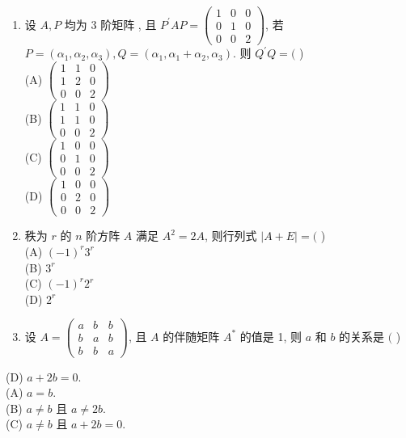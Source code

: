 \documentclass[10pt]{article}
\begin{document}
{\begin{enumerate}
  \item  设  $A, P$  均为  3  阶矩阵 ,  且  $P^{\prime} A P=\left(\begin{array}{lll}1 & 0 & 0 \\ 0 & 1 & 0 \\ 0 & 0 & 2\end{array}\right)$,  若  $P=\left(\alpha_{1}, \alpha_{2}, \alpha_{3}\right), Q=\left(\alpha_{1}, \alpha_{1}+\alpha_{2}, \alpha_{3}\right)$.  则  $Q^{\prime} Q=($ )\\
(A) $\left(\begin{array}{lll}1 & 1 & 0 \\ 1 & 2 & 0 \\ 0 & 0 & 2\end{array}\right)$\\
(B) $\left(\begin{array}{lll}1 & 1 & 0 \\ 1 & 1 & 0 \\ 0 & 0 & 2\end{array}\right)$\\
(C) $\left(\begin{array}{lll}1 & 0 & 0 \\ 0 & 1 & 0 \\ 0 & 0 & 2\end{array}\right)$\\
(D) $\left(\begin{array}{lll}1 & 0 & 0 \\ 0 & 2 & 0 \\ 0 & 0 & 2\end{array}\right)$

  \item  秩为  $r$  的  $n$  阶方阵  $A$  满足  $A^{2}=2 A$,  则行列式  $|A+E|=($ )\\
(A) $(-1)^{r} 3^{r}$\\
(B) $3^{r}$\\
(C) $(-1)^{r} 2^{r}$\\
(D) $2^{r}$

  \item  设  $A=\left(\begin{array}{lll}a & b & b \\ b & a & b \\ b & b & a\end{array}\right)$,  且  $A$  的伴随矩阵  $A^{*}$  的值是  1,  则  $a$  和  $b$  的关系是  $($ )

\end{enumerate}
(D) $a+2 b=0$.\\
(A) $a=b$.\\
(B) $a \neq b$  且  $a \neq 2 b$.\\
(C) $a \neq b$  且  $a+2 b=0$.

}
\end{document}

